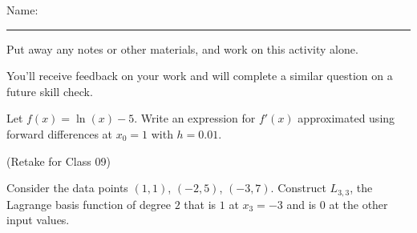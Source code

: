 \documentclass[12pt,letterpaper,noanswers]{exam}
\begin{document}
 \pdfpageheight 11in 
  \pdfpagewidth 8.5in

\noindent Name: \rule{2.5in}{0.5pt}

\noindent Put away any notes or other materials, and work on this activity alone.

\noindent You'll receive feedback on your work and will complete a similar question on a future skill check.


\begin{questions}
\item 
Let $f(x) = \ln(x)-5$.  Write an expression for $f'(x)$ approximated using forward differences at $x_0 = 1$ with $h = 0.01$.
\vspace{6.5cm}
\item (Retake for Class 09)

Consider the data points $(1,1)$, $(-2, 5)$, $(-3, 7)$.  Construct $L_{3,3}$, the Lagrange basis function of degree $2$ that is $1$ at $x_3 = -3$ and is $0$ at the other input values.
\end{questions}
\end{document}

